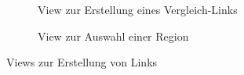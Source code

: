 \documentclass[notables, nomenclature, oneside, 150]{HSMW-Thesis}
\begin{document}
\begin{figure}[th]
\begin{subfigure}[t]{0.3\textwidth}
        			\caption{View zur Erstellung eines Vergleich-Links}
        			\label{fig:l2}
    			\end{subfigure}
    			\begin{subfigure}[t]{0.3\textwidth}
        			\caption{View zur Auswahl einer Region}
        			\label{fig:l3}
    			\end{subfigure}
    			\caption{Views zur Erstellung von Links}
				\label{fig:link1}
			\end{figure}
\end{document}
